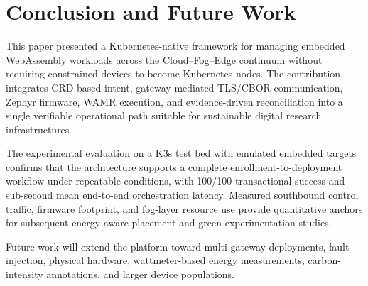 \section{Conclusion and Future Work}\label{sec:conclusion}

This paper presented a Kubernetes-native framework for managing embedded WebAssembly workloads across the Cloud--Fog--Edge continuum without requiring constrained devices to become Kubernetes nodes. The contribution integrates CRD-based intent, gateway-mediated TLS/CBOR communication, Zephyr firmware, WAMR execution, and evidence-driven reconciliation into a single verifiable operational path suitable for sustainable digital research infrastructures.

The experimental evaluation on a K3s test bed with emulated embedded targets confirms that the architecture supports a complete enrollment-to-deployment workflow under repeatable conditions, with 100/100 transactional success and sub-second mean end-to-end orchestration latency. Measured southbound control traffic, firmware footprint, and fog-layer resource use provide quantitative anchors for subsequent energy-aware placement and green-experimentation studies.

Future work will extend the platform toward multi-gateway deployments, fault injection, physical hardware, wattmeter-based energy measurements, carbon-intensity annotations, and larger device populations.
